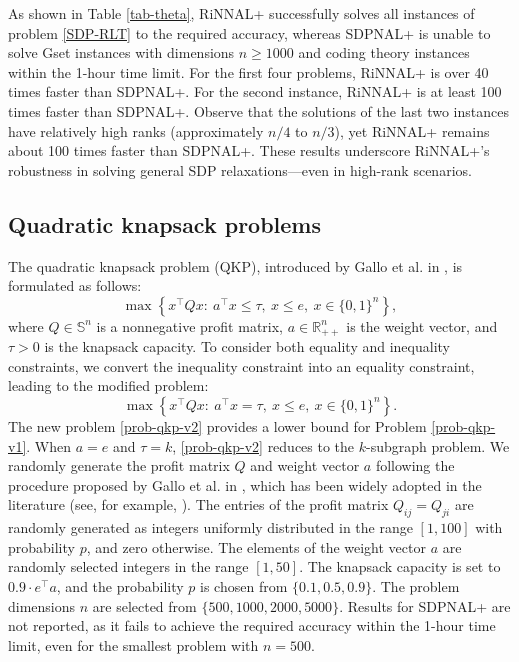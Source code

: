 \documentclass[11pt]{article}
\theoremstyle{plain}
\def\R{\mathbb{R}}
\def\S{\mathbb{S}}
\begin{document}
As shown in Table \ref{tab-theta}, RiNNAL+ successfully solves all instances of problem \eqref{SDP-RLT} to the required accuracy, whereas SDPNAL+ is unable to solve Gset instances with dimensions $n \geq 1000$ and coding theory instances within the 1-hour time limit. For the first four problems, RiNNAL+ is over 40 times faster than SDPNAL+. For the second instance, RiNNAL+ is at least 100 times faster than SDPNAL+. Observe that the solutions of the last two instances have relatively high ranks (approximately $n/4$ to $n/3$), yet RiNNAL+ remains about 100 times faster than SDPNAL+. These results underscore RiNNAL+’s robustness in solving general SDP relaxations—even in high-rank scenarios.


\subsection{Quadratic knapsack problems}\label{subsec-QKP}

The quadratic knapsack problem (QKP), introduced by Gallo et al. in \cite{gallo1980quadratic}, is formulated as follows:
\begin{equation}\label{prob-qkp-v1}
\max\left\{x^{\top} Q x:\ a^\top x\leq \tau,\ x\leq e,\ x \in\{0,1\}^n\right\},
\end{equation}
where $Q\in \S^n$ is a nonnegative profit matrix, $a\in \R^n_{++}$ is the weight vector, and $\tau>0$ is the knapsack capacity. To consider both equality and inequality constraints, we convert the inequality constraint into an equality constraint, leading to the modified problem:
\begin{equation}\label{prob-qkp-v2}
\max\left\{x^{\top} Q x:\ a^\top x= \tau,\ x\leq e,\ x \in\{0,1\}^n\right\}.\tag{QKP-S}
\end{equation}
The new problem \eqref{prob-qkp-v2} provides a lower bound for Problem \eqref{prob-qkp-v1}. When $a=e$ and $\tau=k$, \eqref{prob-qkp-v2} reduces to the $k$-subgraph problem. We randomly generate the profit matrix $Q$ and weight vector $a$ following the procedure proposed by Gallo et al. in \cite{gallo1980quadratic}, which has been widely adopted in the literature (see, for example, \cite{caprara1999exact,billionnet2004exact,pisinger2007quadratic,tang2024feasible}). The entries of the profit matrix $Q_{ij} = Q_{ji}$ are randomly generated as integers uniformly distributed in the range $[1, 100]$ with probability $p$, and zero otherwise. The elements of the weight vector $a$ are randomly selected integers in the range $[1, 50]$. The knapsack capacity is set to $0.9 \cdot e^\top a$, and the probability $p$ is chosen from $\{0.1, 0.5, 0.9\}$. The problem dimensions $n$ are selected from $\{500, 1000, 2000, 5000\}$.
Results for SDPNAL+ are not reported, as it fails to achieve the required accuracy within the 1-hour time limit, even for the smallest problem with $n = 500$.
\end{document}
